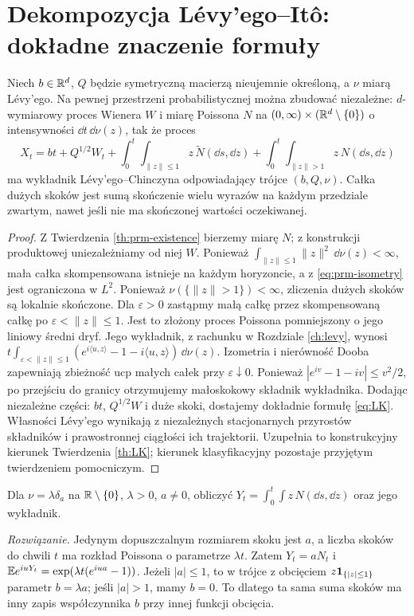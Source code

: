 \section{Dekompozycja Lévy'ego--Itô: dokładne znaczenie formuły}

\begin{twierdzenie}
\label{th:levy-ito-made}
Niech $b\in\mathbb{R}^d$, $Q$ będzie symetryczną macierzą
nieujemnie określoną, a $\nu$ miarą Lévy'ego.
Na pewnej przestrzeni probabilistycznej można zbudować
niezależne: $d$-wymiarowy proces Wienera $W$ i miarę
Poissona $N$ na $(0,\infty)\times(\mathbb{R}^d\setminus\{0\})$
o intensywności $\dd t\,\dd\nu(z)$, tak że proces
\[
X_t=bt+Q^{1/2}W_t
+\int_0^t\int_{\|z\|\le1}z\,\widetilde N(\dd s,\dd z)
+\int_0^t\int_{\|z\|>1}z\,N(\dd s,\dd z)
\tag{11.4}\label{eq:levy-ito-made}
\]
ma wykładnik Lévy'ego--Chinczyna odpowiadający trójce
$(b,Q,\nu)$. Całka dużych skoków jest sumą skończenie
wielu wyrazów na każdym przedziale zwartym, nawet jeśli
nie ma skończonej wartości oczekiwanej.
\end{twierdzenie}
\begin{proof}
Z Twierdzenia \ref{th:prm-existence} bierzemy miarę $N$;
z konstrukcji produktowej uniezależniamy od niej $W$.
Ponieważ $\int_{\|z\|\le1}\|z\|^2\,\dd\nu(z)<\infty$,
mała całka skompensowana istnieje na każdym horyzoncie,
a z \eqref{eq:prm-isometry} jest ograniczona w $L^2$.
Ponieważ $\nu(\{\|z\|>1\})<\infty$, zliczenia dużych
skoków są lokalnie skończone. Dla $\varepsilon>0$
zastąpmy małą całkę przez skompensowaną całkę po
$\varepsilon<\|z\|\le1$. Jest to złożony proces
Poissona pomniejszony o jego liniowy średni dryf.
Jego wykładnik, z rachunku w Rozdziale \ref{ch:levy},
wynosi $t\int_{\varepsilon<\|z\|\le1}
(e^{i\langle u,z\rangle}-1-i\langle u,z\rangle)\,\dd\nu(z)$.
Izometria i nierówność Dooba zapewniają zbieżność ucp
małych całek przy $\varepsilon\downarrow0$.
Ponieważ $|e^{iv}-1-iv|\le v^2/2$, po przejściu
do granicy otrzymujemy małoskokowy składnik wykładnika.
Dodając niezależne części: $bt$, $Q^{1/2}W$ i duże skoki,
dostajemy dokładnie formułę \eqref{eq:LK}.
Własności Lévy'ego wynikają z niezależnych stacjonarnych
przyrostów składników i prawostronnej ciągłości ich
trajektorii. Uzupełnia to konstrukcyjny kierunek
Twierdzenia \ref{th:LK}; kierunek klasyfikacyjny pozostaje
przyjętym twierdzeniem pomocniczym.
\end{proof}

\begin{zadanie}
Dla $\nu=\lambda\delta_a$ na $\mathbb{R}\setminus\{0\}$,
$\lambda>0$, $a\ne0$, obliczyć
$Y_t=\int_0^t\int z\,N(\dd s,\dd z)$ oraz jego wykładnik.

\emph{Rozwiązanie.} Jedynym dopuszczalnym rozmiarem skoku
jest $a$, a liczba skoków do chwili $t$ ma rozkład
Poissona o parametrze $\lambda t$. Zatem $Y_t=aN_t$ i
$\mathbb{E} e^{iuY_t}=\exp(\lambda t(e^{iua}-1))$.
Jeżeli $|a|\le1$, to w trójce z obcięciem $z\mathbf{1}_{\{|z|\le1\}}$
parametr $b=\lambda a$; jeśli $|a|>1$, mamy $b=0$.
To dlatego ta sama suma skoków ma inny zapis współczynnika
$b$ przy innej funkcji obcięcia.
\end{zadanie}

